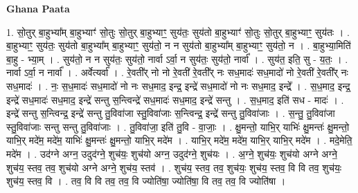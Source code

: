 \documentclass[17pt]{extarticle}
\begin{document}
\textbf{Ghana Paata } \newline

1. सो॒तुर् बा॒हुभ्या᳚म् बा॒हुभ्याꣳ॑ सो॒तुः सो॒तुर् बा॒हुभ्याꣳ॒॒ सुय॑तः॒ सुय॑तो बा॒हुभ्याꣳ॑ सो॒तुः सो॒तुर् बा॒हुभ्याꣳ॒॒ सुय॑तः । . बा॒हुभ्याꣳ॒॒ सुय॑तः॒ सुय॑तो बा॒हुभ्या᳚म् बा॒हुभ्याꣳ॒॒ सुय॑तो॒ न न सुय॑तो बा॒हुभ्या᳚म् बा॒हुभ्याꣳ॒॒ सुय॑तो॒ न । . बा॒हुभ्या॒मिति॑ बा॒हु - भ्या॒म् । . सुय॑तो॒ न न सुय॑तः॒ सुय॑तो॒ नार्वा ऽर्वा॒ न सुय॑तः॒ सुय॑तो॒ नार्वा᳚ । . सुय॑त॒ इति॒ सु - य॒तः॒ । . नार्वा ऽर्वा॒ न नार्वा᳚ । . अर्वेत्यर्वा᳚ । . रे॒वती᳚र् नो नो रे॒वती॑ रे॒वती᳚र् नः सध॒मादः॑ सध॒मादो॑ नो रे॒वती॑ रे॒वती᳚र् नः सध॒मादः॑ । . नः॒ स॒ध॒मादः॑ सध॒मादो॑ नो नः सध॒माद॒ इन्द्र॒ इन्द्रे॑ सध॒मादो॑ नो नः सध॒माद॒ इन्द्रे᳚ । . स॒ध॒माद॒ इन्द्र॒ इन्द्रे॑ सध॒मादः॑ सध॒माद॒ इन्द्रे॑ सन्तु स॒न्त्विन्द्रे॑ सध॒मादः॑ सध॒माद॒ इन्द्रे॑ सन्तु । . स॒ध॒माद॒ इति॑ सध - मादः॑ । . इन्द्रे॑ सन्तु स॒न्त्विन्द्र॒ इन्द्रे॑ सन्तु तु॒विवा॑जा स्तु॒विवा॑जाः स॒न्त्विन्द्र॒ इन्द्रे॑ सन्तु तु॒विवा॑जाः । . स॒न्तु॒ तु॒विवा॑जा स्तु॒विवा॑जाः सन्तु सन्तु तु॒विवा॑जाः । . तु॒विवा॑जा॒ इति॑ तु॒वि - वा॒जाः॒ । . क्षु॒मन्तो॒ याभि॒र् याभिः॑ क्षु॒मन्तः॑ क्षु॒मन्तो॒ याभि॒र् मदे॑म॒ मदे॑म॒ याभिः॑ क्षु॒मन्तः॑ क्षु॒मन्तो॒ याभि॒र् मदे॑म । . याभि॒र् मदे॑म॒ मदे॑म॒ याभि॒र् याभि॒र् मदे॑म । . मदे॒मेति॒ मदे॑म । . उद॑ग्ने अग्न॒ उदुद॑ग्ने॒ शुच॑यः॒ शुच॑यो अग्न॒ उदुद॑ग्ने॒ शुच॑यः । . अ॒ग्ने॒ शुच॑यः॒ शुच॑यो अग्ने अग्ने॒ शुच॑य॒ स्तव॒ तव॒ शुच॑यो अग्ने अग्ने॒ शुच॑य॒ स्तव॑ । . शुच॑य॒ स्तव॒ तव॒ शुच॑यः॒ शुच॑य॒ स्तव॒ वि वि तव॒ शुच॑यः॒ शुच॑य॒ स्तव॒ वि । . तव॒ वि वि तव॒ तव॒ वि ज्योति॑षा॒ ज्योति॑षा॒ वि तव॒ तव॒ वि ज्योति॑षा । \newline
\end{document}

